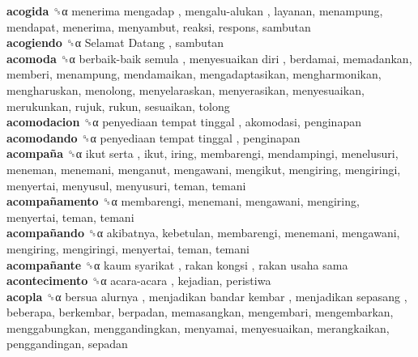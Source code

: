 \textbf{acogida} ␝α   menerima mengadap ,  mengalu-alukan , layanan, menampung, mendapat, menerima, menyambut, reaksi, respons, sambutan  \\
\textbf{acogiendo} ␝α   Selamat Datang , sambutan  \\
\textbf{acomoda} ␝α   berbaik-baik semula ,  menyesuaikan diri , berdamai, memadankan, memberi, menampung, mendamaikan, mengadaptasikan, mengharmonikan, mengharuskan, menolong, menyelaraskan, menyerasikan, menyesuaikan, merukunkan, rujuk, rukun, sesuaikan, tolong  \\
\textbf{acomodacion} ␝α   penyediaan tempat tinggal , akomodasi, penginapan  \\
\textbf{acomodando} ␝α   penyediaan tempat tinggal , penginapan  \\
\textbf{acompaña} ␝α   ikut serta , ikut, iring, membarengi, mendampingi, menelusuri, meneman, menemani, menganut, mengawani, mengikut, mengiring, mengiringi, menyertai, menyusul, menyusuri, teman, temani  \\
\textbf{acompañamento} ␝α  membarengi, menemani, mengawani, mengiring, menyertai, teman, temani  \\
\textbf{acompañando} ␝α  akibatnya, kebetulan, membarengi, menemani, mengawani, mengiring, mengiringi, menyertai, teman, temani  \\
\textbf{acompañante} ␝α   kaum syarikat ,  rakan kongsi ,  rakan usaha sama   \\
\textbf{acontecimento} ␝α   acara-acara , kejadian, peristiwa  \\
\textbf{acopla} ␝α   bersua alurnya ,  menjadikan bandar kembar ,  menjadikan sepasang , beberapa, berkembar, berpadan, memasangkan, mengembari, mengembarkan, menggabungkan, menggandingkan, menyamai, menyesuaikan, merangkaikan, penggandingan, sepadan  \\
